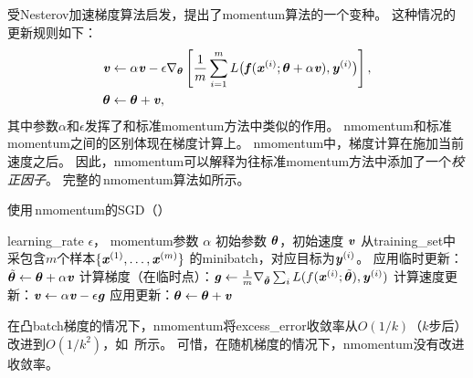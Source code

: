 \subsection{}
\label{sec:nesterov_momentum}
受Nesterov加速梯度算法\citep{Nesterov83b,Nesterov03}启发，\cite{sutskeverimportance}提出了\gls{momentum}算法的一个变种。
这种情况的更新规则如下：
\begin{align}
    \boldsymbol{\mathit{v}} &\leftarrow \alpha\boldsymbol{\mathit{v}} - \epsilon \nabla_{\boldsymbol{\theta}} \left[
    \frac{1}{m} \sum_{i=1}^m L\big( \boldsymbol{\mathit{f}}(\boldsymbol{\mathit{x}}^{(i)}; \boldsymbol{\theta} + \alpha \boldsymbol{\mathit{v}}), \boldsymbol{\mathit{y}}^{(i)} \big)
 \right], \\
    \boldsymbol{\theta} &\leftarrow \boldsymbol{\theta} + \boldsymbol{\mathit{v}} ,
\end{align}
其中参数$\alpha$和$\epsilon$发挥了和标准\gls{momentum}方法中类似的作用。 
\gls{nmomentum}和标准\gls{momentum}之间的区别体现在梯度计算上。
\gls{nmomentum}中，梯度计算在施加当前速度之后。
因此，\gls{nmomentum}可以解释为往标准\gls{momentum}方法中添加了一个\emph{校正因子}。
完整的\,\gls{nmomentum}算法如所示。


\begin{algorithm}[ht]
\caption{使用\,\gls{nmomentum}的\gls{SGD}（）}
\label{alg:nesterov}
\begin{algorithmic}
\REQUIRE  \gls{learning_rate} $\epsilon$， \gls{momentum}参数 $\alpha$
\REQUIRE 初始参数 $\boldsymbol{\theta}$，初始速度 $\boldsymbol{\mathit{v}}$
    \STATE 从\gls{training_set}中采包含$m$个样本$\{ \boldsymbol{\mathit{x}}^{(1)},\dots, \boldsymbol{\mathit{x}}^{(m)}\}$ 的\gls{minibatch}，对应目标为$\boldsymbol{\mathit{y}}^{(i)}$。
    \STATE 应用临时更新： $\tilde{\boldsymbol{\theta}} \leftarrow \boldsymbol{\theta}  + \alpha \boldsymbol{\mathit{v}}$
         \STATE 计算梯度（在临时点）：$\boldsymbol{\mathit{g}} \leftarrow 
         \frac{1}{m} \nabla_{\tilde{\boldsymbol{\theta}}} \sum_i L(f(\boldsymbol{\mathit{x}}^{(i)};\tilde{\boldsymbol{\theta}}),\boldsymbol{\mathit{y}}^{(i)})$
    \STATE 计算速度更新：$\boldsymbol{\mathit{v}} \leftarrow \alpha \boldsymbol{\mathit{v}} - 
    \epsilon \boldsymbol{\mathit{g}}$
    \STATE 应用更新：$\boldsymbol{\theta} \leftarrow \boldsymbol{\theta} + \boldsymbol{\mathit{v}}$ 
\ENDWHILE
\end{algorithmic}
\end{algorithm}



在凸\gls{batch}梯度的情况下，\gls{nmomentum}将\gls{excess_error}收敛率从$O(1/k)$（$k$步后）改进到$O(1/k^2)$，如~\cite{Nesterov83b}所示。
可惜，在随机梯度的情况下，\gls{nmomentum}没有改进收敛率。


